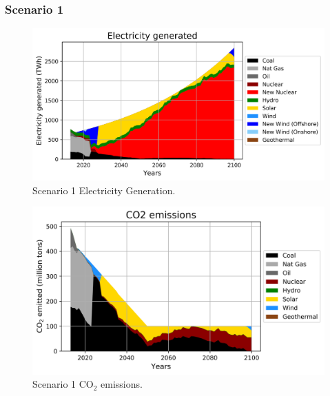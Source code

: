 \begin{frame}
  \frametitle{Scenario 1}
  \begin{figure}[htbp!]
    \begin{center}
      \includegraphics[scale=0.6]{./images/conv_nuc_elc}
    \end{center}
          \caption{Scenario 1 Electricity Generation.}
    \label{s1e}
  \end{figure}
\end{frame}

\begin{frame}
  \begin{figure}[htbp!]
    \begin{center}
      \includegraphics[scale=0.6]{./images/conv_nuc_co2}
    \end{center}
          \caption{Scenario 1 CO$_2$ emissions.}
    \label{s1c}
  \end{figure}

\end{frame}
